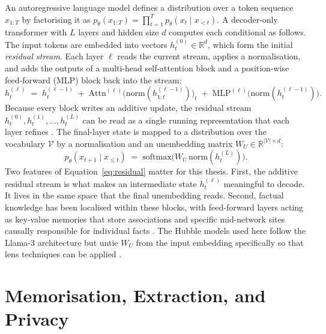 An autoregressive language model defines a distribution over a token sequence
$x_{1:T}$ by factorising it as $p_\theta(x_{1:T}) = \prod_{t=1}^{T} p_\theta(x_t \mid x_{<t})$. A
decoder-only transformer with $L$ layers and hidden size $d$ computes each conditional as follows. The
input tokens are embedded into vectors $h^{(0)}_t \in \mathbb{R}^d$, which form the initial
\emph{residual stream}. Each layer $\ell$ reads the current stream, applies a normalisation, and adds the
outputs of a multi-head self-attention block and a position-wise feed-forward (MLP) block back into the
stream:
\begin{equation}
  h^{(\ell)}_t \;=\; h^{(\ell-1)}_t \;+\; \mathrm{Attn}^{(\ell)}\!\bigl(\mathrm{norm}(h^{(\ell-1)}_{1:t})\bigr)_t
                                    \;+\; \mathrm{MLP}^{(\ell)}\!\bigl(\mathrm{norm}(h^{(\ell-1)}_t)\bigr).
  \label{eq:residual}
\end{equation}
Because every block writes an additive update, the residual stream $h^{(0)}_t, h^{(1)}_t, \dots,
h^{(L)}_t$ can be read as a single running representation that each layer refines
\citep{elhage2021framework}. The final-layer state is mapped to a distribution over the vocabulary
$\mathcal{V}$ by a normalisation and an unembedding matrix $W_U \in \mathbb{R}^{|\mathcal{V}| \times d}$:
\begin{equation}
  p_\theta(x_{t+1} \mid x_{\le t}) \;=\; \mathrm{softmax}\bigl(W_U\,\mathrm{norm}(h^{(L)}_t)\bigr).
  \label{eq:unembed}
\end{equation}
Two features of Equation~\eqref{eq:residual} matter for this thesis. First, the additive residual stream
is what makes an intermediate state $h^{(\ell)}_t$ meaningful to decode. It lives in the same space that
the final unembedding reads. Second, factual knowledge has been localised within these blocks, with
feed-forward layers acting as key-value memories that store associations \citep{geva2021kv} and specific
mid-network sites causally responsible for individual facts \citep{meng2022rome}. The Hubble models used
here follow the Llama-3 architecture but untie $W_U$ from the input embedding specifically so that lens
techniques can be applied \citep{allegro2025hubble}.

\section{Memorisation, Extraction, and Privacy}
\label{sec:bg-memorisation}

